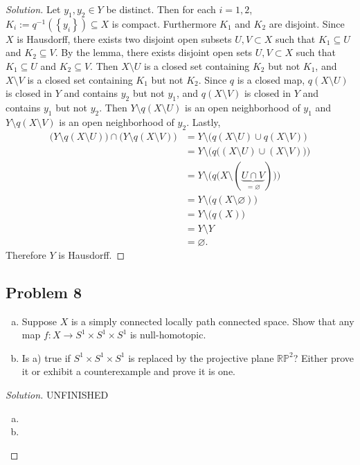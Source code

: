 \documentclass[12pt]{article}
\newcommand\inv[1]{#1^{-1}}
\newcommand\paren[1]{\left( #1 \right)}
\newcommand\setb[1]{\left \{ #1 \right \}}
\theoremstyle{definition}
\begin{document}
\begin{proof}[Solution]
    Let $y_1 , y_2 \in Y$ be distinct. Then for each $i = 1, 2$, $K_i := \inv{q} \paren{ \setb{ y_i } } \subseteq X$ is compact. Furthermore $K_1$ and $K_2$ are disjoint. Since $X$ is Hausdorff, there exists two disjoint open subsets $U , V \subset X$ such that $K_1 \subseteq U$ and $K_2 \subseteq V$. By the lemma, there exists disjoint open sets $U , V \subset X$ such that $K_1 \subseteq U$ and $K_2 \subseteq V$. Then $X \setminus U$ is a closed set containing $K_2$ but not $K_1$, and $X \setminus V$ is a closed set containing $K_1$ but not $K_2$. Since $q$ is a closed map, $q(X \setminus U)$ is closed in $Y$ and contains $y_2$ but not $y_1$, and $q(X \setminus V)$ is closed in $Y$ and contains $y_1$ but not $y_2$. Then $Y \setminus q(X \setminus U)$ is an open neighborhood of $y_1$ and $Y \setminus q(X \setminus V)$ is an open neighborhood of $y_2$. Lastly,
    \begin{align*}
        \big( Y \setminus q(X \setminus U) \big) \cap \big( Y \setminus q(X \setminus V) \big) & = Y \setminus \big( q(X \setminus U) \cup q(X \setminus V) \big) \\
        & = Y \setminus \Big( q \big( ( X \setminus U ) \cup (X \setminus V) \big) \Big) \\
        & = Y \setminus \Big( q \big( X \setminus ( \underbrace{ U \cap V }_{ = \varnothing } ) \big) \Big) \\
        & = Y \setminus \big( q(X \setminus \varnothing) \big) \\
        & = Y \setminus \big( q(X) \big) \\
        & = Y \setminus Y \\
        & = \varnothing.
    \end{align*}
    Therefore $Y$ is Hausdorff.
\end{proof}
\subsection{Problem 8}
\begin{enumerate}[a)]
    \item Suppose $X$ is a simply connected locally path connected space. Show that any map $f : X \to S^1 \times S^1 \times S^1$ is null-homotopic.
    \item Is a) true if $S^1 \times S^1 \times S^1$ is replaced by the projective plane $\mathbb{RP}^2$? Either prove it or exhibit a counterexample and prove it is one.
\end{enumerate}
\begin{proof}[Solution]
    UNFINISHED
    \begin{enumerate}[a)]
        \item 
        \item 
    \end{enumerate}
\end{proof}
\end{document}
